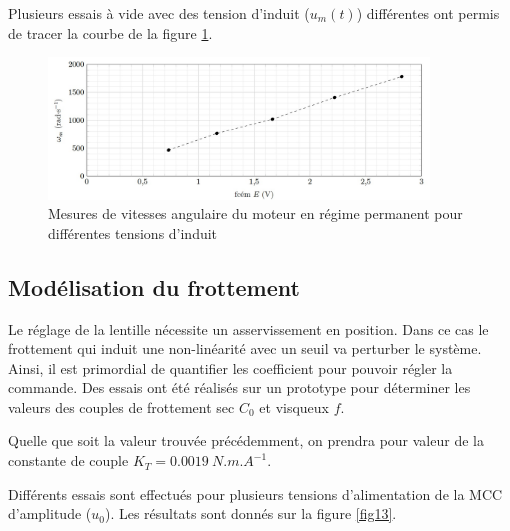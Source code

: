 Plusieurs essais à vide avec des tension d'induit ($u_m(t)$) différentes ont permis de tracer la courbe de la
figure \ref{fig12}.


\begin{figure}[!htb]
\begin{center}
\includegraphics[width=0.9\textwidth]{images/image_fig12.jpg}
\caption{Mesures de vitesses angulaire du moteur en régime permanent pour différentes tensions d’induit \label{fig12}}
\end{center}
\end{figure}

\subsection{Modélisation du frottement}

Le réglage de la lentille nécessite un asservissement en position. Dans ce cas le frottement qui induit une non-linéarité avec un seuil va perturber le système. Ainsi, il est primordial de quantifier les coefficient pour pouvoir
régler la commande. Des essais ont été réalisés sur un prototype pour déterminer les valeurs des couples de
frottement sec $C_0$ et visqueux $f$.

Quelle que soit la valeur trouvée précédemment, on prendra pour valeur de la constante de couple $K_T= \SI{0,0019}{N. m. A^{-1}}$.

Différents essais sont effectués pour plusieurs tensions d'alimentation de la MCC d'amplitude ($u_0$). Les résultats sont donnés sur
la figure \ref{fig13}.

